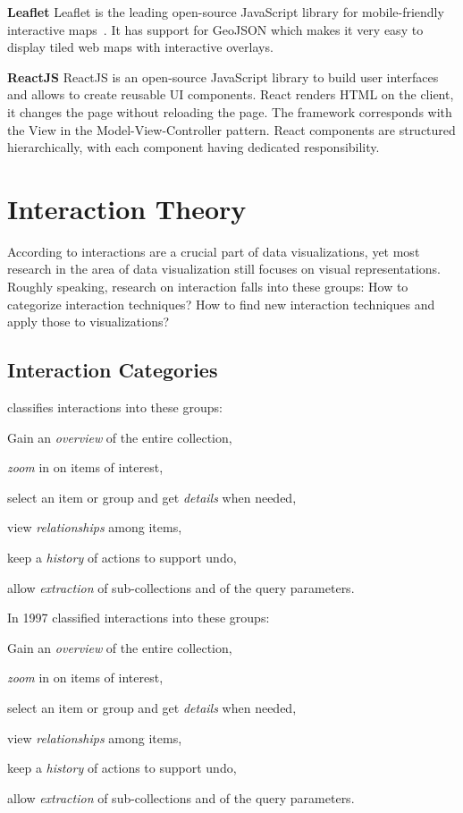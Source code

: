 \textbf{Leaflet}
Leaflet is the leading open-source JavaScript library for mobile-friendly interactive maps~\cite{Leaflet2017}.
It has support for GeoJSON which makes it very easy to display tiled web maps with interactive overlays.

\textbf{ReactJS}
ReactJS is an open-source JavaScript library to build user interfaces and allows to create reusable UI components.
React renders HTML on the client, it changes the page without reloading the page.
The framework corresponds with the View in the Model-View-Controller pattern.
React components are structured hierarchically, with each component having dedicated responsibility.


\section{Interaction Theory}\label{sec:related-work:interaction-theory}
According to \textcite{Ho2013} interactions are a crucial part of data visualizations, yet most research in the area of data visualization still focuses on visual representations.
Roughly speaking, research on interaction falls into these groups:
How to categorize interaction techniques?
How to find new interaction techniques and apply those to visualizations?

\subsection{Interaction Categories}\label{sec:related-work:interaction-theory:categories}
\textcite{Shneiderman1996} classifies interactions into these groups:
\begin{enumerate*}[label=(\arabic*)]
  \item
    Gain an \emph{overview} of the entire collection,
  \item
    \emph{zoom} in on items of interest,
  \item
    select an item or group and get \emph{details} when needed,
  \item
    view \emph{relationships} among items,
  \item
    keep a \emph{history} of actions to support undo,
  \item
    allow \emph{extraction} of sub-collections and of the query parameters.
\end{enumerate*}

In 1997 \textcite{Shneiderman1996} classified interactions into these groups:
\begin{enumerate*}[label=(\arabic*)]
  \item
    Gain an \emph{overview} of the entire collection,
  \item
    \emph{zoom} in on items of interest,
  \item
    select an item or group and get \emph{details} when needed,
  \item
    view \emph{relationships} among items,
  \item
    keep a \emph{history} of actions to support undo,
  \item
    allow \emph{extraction} of sub-collections and of the query parameters.
\end{enumerate*}

